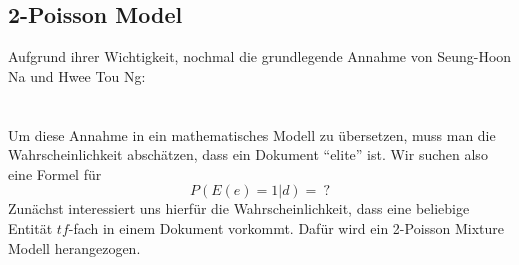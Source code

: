 \subsection{2-Poisson Model}
Aufgrund ihrer Wichtigkeit, nochmal die grundlegende Annahme von Seung-Hoon Na und Hwee Tou Ng:\\
\\
\\
Um diese Annahme in ein mathematisches Modell zu übersetzen, muss man die Wahrscheinlichkeit abschätzen, dass ein Dokument ``elite'' ist. Wir suchen also eine Formel für
\[P\left( E\left( e \right)=1|d \right)=\ ?\]
Zunächst interessiert uns hierfür die Wahrscheinlichkeit, dass eine beliebige Entität $tf$-fach in einem Dokument vorkommt. Dafür wird ein 2-Poisson Mixture Modell herangezogen.

